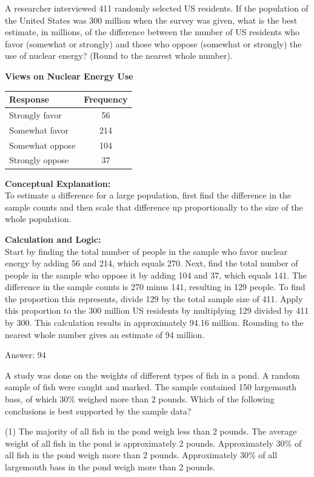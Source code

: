 \documentclass[11pt,paper=a4,answers]{exam}
\begin{document}
\begin{questions}
A researcher interviewed 411 randomly selected US residents. If the population of the United States was 300 million when the survey was given, what is the best estimate, in millions, of the difference between the number of US residents who favor (somewhat or strongly) and those who oppose (somewhat or strongly) the use of nuclear energy? (Round to the nearest whole number).
\begin{center}
\textbf{Views on Nuclear Energy Use}
\begin{tabular}{|l|c|}
\hline
\textbf{Response} & \textbf{Frequency} \\ \hline
Strongly favor & 56 \\ \hline
Somewhat favor & 214 \\ \hline
Somewhat oppose & 104 \\ \hline
Strongly oppose & 37 \\ \hline
\end{tabular}
\end{center}
\begin{solution}
\textbf{Conceptual Explanation:} \\
To estimate a difference for a large population, first find the difference in the sample counts and then scale that difference up proportionally to the size of the whole population.

\vspace{30pt}

\textbf{Calculation and Logic:} \\
Start by finding the total number of people in the sample who favor nuclear energy by adding 56 and 214, which equals 270. Next, find the total number of people in the sample who oppose it by adding 104 and 37, which equals 141. The difference in the sample counts is 270 minus 141, resulting in 129 people. To find the proportion this represents, divide 129 by the total sample size of 411. Apply this proportion to the 300 million US residents by multiplying 129 divided by 411 by 300. This calculation results in approximately 94.16 million. Rounding to the nearest whole number gives an estimate of 94 million.

\vspace{30pt}

Answer: \colorbox{yellow!100}{94}
\end{solution}

\vspace{60pt}

\question
A study was done on the weights of different types of fish in a pond. A random sample of fish were caught and marked. The sample contained 150 largemouth bass, of which 30\% weighed more than 2 pounds. Which of the following conclusions is best supported by the sample data?
\begin{tasks}(1)
    \task The majority of all fish in the pond weigh less than 2 pounds.
    \task The average weight of all fish in the pond is approximately 2 pounds.
    \task Approximately 30\% of all fish in the pond weigh more than 2 pounds.
    \task Approximately 30\% of all largemouth bass in the pond weigh more than 2 pounds.
\end{tasks}


\end{questions}
\end{document}
